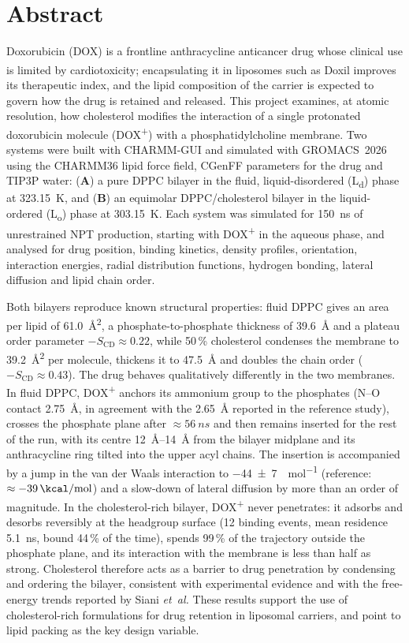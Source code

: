 \documentclass[11pt,a4paper]{article}
\newcommand{\dox}{DOX\textsuperscript{+}}
\newcommand{\scd}{S_{\mathrm{CD}}}
\newcommand{\sysA}{\textcolor{sysA}{\textbf{A}}}
\newcommand{\sysB}{\textcolor{sysB}{\textbf{B}}}
\newcommand{\Ld}{L\textsubscript{d}}
\newcommand{\Lo}{L\textsubscript{o}}
\begin{document}
\section*{Abstract}

Doxorubicin (DOX) is a frontline anthracycline anticancer drug whose clinical use is
limited by cardiotoxicity; encapsulating it in liposomes such as Doxil\textsuperscript{\textregistered}
improves its therapeutic index, and the lipid composition of the carrier is expected to govern how the
drug is retained and released. This project examines, at atomic resolution, how
cholesterol modifies the interaction of a single protonated doxorubicin molecule (\dox) with a
phosphatidylcholine membrane. Two systems were built with CHARMM-GUI and simulated with
GROMACS~2026 using the CHARMM36 lipid force field, CGenFF parameters for the drug and TIP3P water:
(\sysA) a pure DPPC bilayer in the fluid, liquid-disordered (\Ld) phase at \SI{323.15}{K}, and
(\sysB) an equimolar DPPC/cholesterol bilayer in the liquid-ordered (\Lo) phase at \SI{303.15}{K}.
Each system was simulated for \SI{150}{ns} of unrestrained NPT production, starting with \dox{} in the
aqueous phase, and analysed for drug position, binding kinetics, density profiles, orientation,
interaction energies, radial distribution functions, hydrogen bonding, lateral diffusion and lipid
chain order.

Both bilayers reproduce known structural properties: fluid DPPC gives an area per lipid of
\SI{61.0}{\angstrom^2}, a phosphate-to-phosphate thickness of \SI{39.6}{\angstrom} and a
plateau order parameter $-\scd \approx 0.22$, while 50\,\% cholesterol condenses the membrane to
\SI{39.2}{\angstrom^2} per molecule, thickens it to \SI{47.5}{\angstrom} and doubles the chain order
($-\scd \approx 0.43$). The drug behaves qualitatively differently in the two membranes. In fluid DPPC,
\dox{} anchors its ammonium group to the phosphates (N--O contact \SI{2.75}{\angstrom}, in agreement
with the \SI{2.65}{\angstrom} reported in the reference study), crosses the phosphate plane after
$\approx\SI{56}{ns}$ and then remains inserted for the rest of the run, with its centre
\SI{12}{\angstrom}--\SI{14}{\angstrom} from the bilayer midplane and its anthracycline ring tilted into the
upper acyl chains. The insertion is accompanied by a jump in the van der Waals interaction to
\SI{-44 \pm 7}{\kcal\per\mol} (reference: $\approx\SI{-39}{\kcal\per\mol}$) and a slow-down of lateral
diffusion by more than an order of magnitude. In the cholesterol-rich bilayer, \dox{} never penetrates:
it adsorbs and desorbs reversibly at the headgroup surface (12 binding events, mean residence
\SI{5.1}{ns}, bound 44\,\% of the time), spends 99\,\% of the trajectory outside the phosphate plane, and
its interaction with the membrane is less than half as strong. Cholesterol therefore acts as a barrier to
drug penetration by condensing and ordering the bilayer, consistent with experimental evidence and with
the free-energy trends reported by Siani \emph{et~al.} These results support the use of
cholesterol-rich formulations for drug retention in liposomal carriers, and point to lipid packing as the
key design variable.
\end{document}
